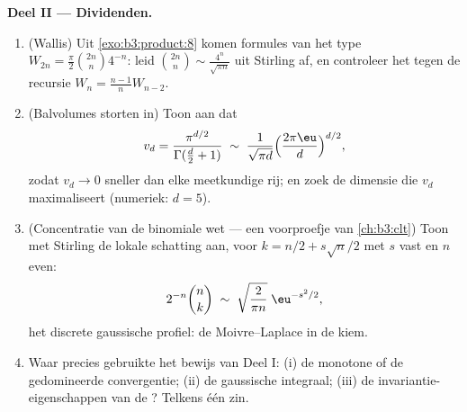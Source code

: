 \begin{problem}
\medskip
\noindent\textbf{Deel II --- Dividenden.}
\begin{enumerate}[resume]
  \item (Wallis) Uit \cref{exo:b3:product:8} komen formules van
        het type $W_{2n} = \frac\pi2\binom{2n}n4^{-n}$: leid
        $\binom{2n}{n} \sim \frac{4^n}{\sqrt{\pi n}}$ uit Stirling
        af, en controleer het tegen de recursie $W_{n} =
        \frac{n-1}nW_{n-2}$.
  \item (Balvolumes storten in) Toon aan dat
        \[
        v_d = \frac{\pi^{d/2}}{\Gamma(\frac d2 + 1)}
        \;\sim\; \frac{1}{\sqrt{\pi d}}
        \Bigl(\frac{2\pi\eu}{d}\Bigr)^{d/2},
        \]
        zodat $v_d \to 0$ sneller dan elke meetkundige rij; en
        zoek de dimensie die $v_d$ maximaliseert (numeriek: $d =
        5$).
  \item (Concentratie van de binomiale wet --- een voorproefje van
        \cref{ch:b3:clt}) Toon met Stirling de lokale schatting
        aan, voor $k = n/2 + s\sqrt n/2$ met $s$ vast en $n$ even:
        \[
        2^{-n}\binom{n}{k} \;\sim\;
        \sqrt{\frac{2}{\pi n}}\;\eu^{-s^2/2},
        \]
        het discrete gaussische profiel: de Moivre--Laplace in de
        kiem.
  \item Waar precies gebruikte het bewijs van Deel I: (i) de
        monotone of de gedomineerde convergentie; (ii) de
        gaussische integraal; (iii) de invariantie-eigenschappen
        van de ? Telkens één zin.
\end{enumerate}


\end{problem}
